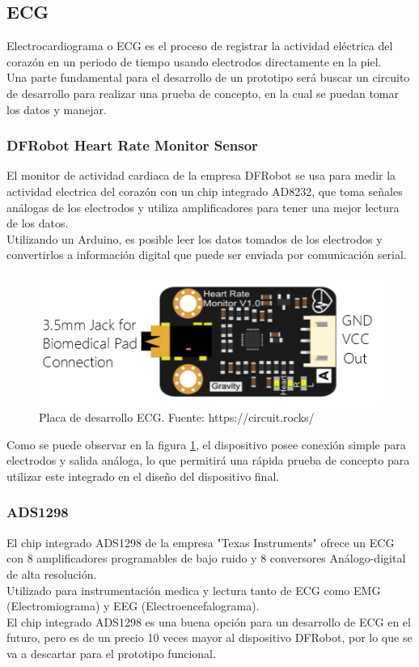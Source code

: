 \subsection{ECG}
Electrocardiograma o ECG es el proceso de registrar la actividad eléctrica del corazón en un periodo de tiempo usando electrodos directamente en la piel.\\
Una parte fundamental para el desarrollo de un prototipo será buscar un circuito de desarrollo para realizar una prueba de concepto, en la cual se puedan tomar los datos y manejar.
\subsubsection{DFRobot Heart Rate Monitor Sensor}
El monitor de actividad cardiaca de la empresa DFRobot se usa para medir la actividad electrica del corazón con un chip integrado AD8232\cite{ad8232}, que toma señales análogas de los electrodos y utiliza amplificadores para tener una mejor lectura de los datos.\\
Utilizando un Arduino, es posible leer los datos tomados de los electrodos y convertirlos a información digital que puede ser enviada por comunicación serial.\\

\begin{figure}[H]
	\centering
	\includegraphics[scale=0.5]{figuras/sensor/ecg/ecg.png}
	\caption{Placa de desarrollo ECG. Fuente: https://circuit.rocks/}
	\label{ecg}
\end{figure}

Como se puede observar en la figura \ref{ecg}, el dispositivo posee conexión simple para electrodos y salida análoga, lo que permitirá una rápida prueba de concepto para utilizar este integrado en el diseño del dispositivo final.


\subsubsection{ADS1298}
El chip integrado ADS1298 de la empresa "Texas Instruments" ofrece un ECG con 8 amplificadores programables de bajo ruido y 8 conversores Análogo-digital de alta resolución.\\
Utilizado para instrumentación medica y lectura tanto de ECG como EMG (Electromiograma) y EEG (Electroencefalograma).\\
El chip integrado ADS1298 es una buena opción para un desarrollo de ECG en el futuro, pero es de un precio 10 veces mayor al dispositivo DFRobot, por lo que se va a descartar para el prototipo funcional.
